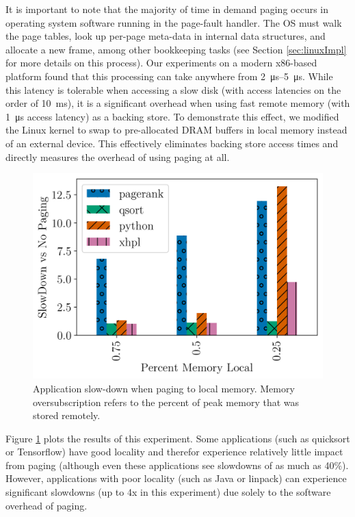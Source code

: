 It is important to note that the majority of time in demand paging occurs in
operating system software running in the page-fault handler. The OS must walk
the page tables, look up per-page meta-data in internal data structures, and
allocate a new frame, among other \gls{bookkeeping} tasks (see Section
\ref{sec:linuxImpl} for more details on this process). Our experiments on a
modern x86-based platform found that this processing can take anywhere from
\SIrange{2}{5}{\micro\second}. While this latency is tolerable when accessing a
slow disk (with access latencies on the order of \SI{10}{\milli\second}), it is
a significant overhead when using fast remote memory (with
\SI{1}{\micro\second} access latency) as a backing store. To demonstrate this
effect, we modified the Linux kernel to swap to pre-allocated DRAM buffers in
local memory instead of an external device.  This effectively eliminates
backing store access times and directly measures the overhead of using paging
at all.

\begin{figure}[h]
    \centering
    \includegraphics[width=0.9\columnwidth]{figs/paging_overhead.png}
    \caption{Application slow-down when paging to local memory. Memory
oversubscription refers to the percent of peak memory that was stored remotely.}
    \label{fig:paging_overhead}
\end{figure}

Figure \ref{fig:paging_overhead} plots the results of this experiment. Some
applications (such as quicksort or Tensorflow) have good locality and therefor
experience relatively little impact from paging (although even these
applications see slowdowns of as much as 40\%). However, applications with
poor locality (such as Java or linpack) can experience significant slowdowns
(up to 4x in this experiment) due solely to the software overhead of paging. 

